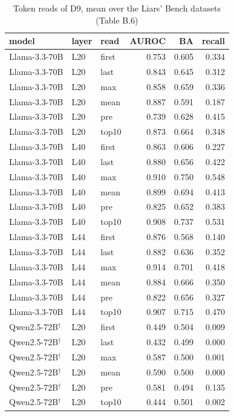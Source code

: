\begin{table}
\caption{Token reads of D9, mean over the Liars' Bench datasets (Table B.6)}
\label{tab:x-token_reads}
\begin{tabular}{lllrrr}
\toprule
model & layer & read & AUROC & BA & recall \\
\midrule
Llama-3.3-70B & L20 & first & 0.753 & 0.605 & 0.334 \\
Llama-3.3-70B & L20 & last & 0.843 & 0.645 & 0.312 \\
Llama-3.3-70B & L20 & max & 0.858 & 0.659 & 0.336 \\
Llama-3.3-70B & L20 & mean & 0.887 & 0.591 & 0.187 \\
Llama-3.3-70B & L20 & pre & 0.739 & 0.628 & 0.415 \\
Llama-3.3-70B & L20 & top10 & 0.873 & 0.664 & 0.348 \\
Llama-3.3-70B & L40 & first & 0.863 & 0.606 & 0.227 \\
Llama-3.3-70B & L40 & last & 0.880 & 0.656 & 0.422 \\
Llama-3.3-70B & L40 & max & 0.910 & 0.750 & 0.548 \\
Llama-3.3-70B & L40 & mean & 0.899 & 0.694 & 0.413 \\
Llama-3.3-70B & L40 & pre & 0.825 & 0.652 & 0.383 \\
Llama-3.3-70B & L40 & top10 & 0.908 & 0.737 & 0.531 \\
Llama-3.3-70B & L44 & first & 0.876 & 0.568 & 0.140 \\
Llama-3.3-70B & L44 & last & 0.882 & 0.636 & 0.352 \\
Llama-3.3-70B & L44 & max & 0.914 & 0.701 & 0.418 \\
Llama-3.3-70B & L44 & mean & 0.884 & 0.666 & 0.350 \\
Llama-3.3-70B & L44 & pre & 0.822 & 0.656 & 0.327 \\
Llama-3.3-70B & L44 & top10 & 0.907 & 0.715 & 0.470 \\
Qwen2.5-72B$^\dagger$ & L20 & first & 0.449 & 0.504 & 0.009 \\
Qwen2.5-72B$^\dagger$ & L20 & last & 0.432 & 0.499 & 0.000 \\
Qwen2.5-72B$^\dagger$ & L20 & max & 0.587 & 0.500 & 0.001 \\
Qwen2.5-72B$^\dagger$ & L20 & mean & 0.590 & 0.500 & 0.000 \\
Qwen2.5-72B$^\dagger$ & L20 & pre & 0.581 & 0.494 & 0.135 \\
Qwen2.5-72B$^\dagger$ & L20 & top10 & 0.444 & 0.501 & 0.002 \\

\end{tabular}
\end{table}
